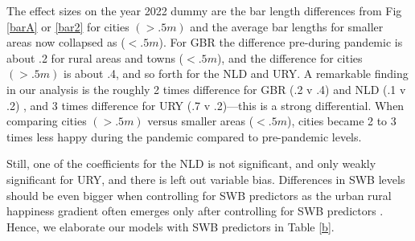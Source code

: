 \documentclass[10pt, letterpaper]{article}
\begin{document}
\begin{spacing}{1.4}
The effect sizes on the year 2022 dummy are the bar length differences from Fig
\ref{barA} or \ref{bar2} for cities $(>.5m)$ and the average bar lengths for smaller
areas now collapsed as ($<.5m$). For GBR the difference pre-during pandemic is about .2 for rural areas and towns ($<.5m$), and the difference for cities $(>.5m)$ is about .4, and so
forth for the NLD and URY.
 A remarkable finding in our analysis is the roughly 2 times difference for GBR (.2 v .4)
 and NLD (.1 v .2) , and 3 times difference for URY (.7 v .2)---this is a strong differential. When comparing cities $(>.5m)$ versus smaller areas ($<.5m$), cities became 2 to 3 times less happy during the pandemic compared to pre-pandemic levels.
 
Still, one of the coefficients for the NLD is not significant, and only weakly
significant for URY, and there is left out variable bias. {Differences in SWB levels should be even bigger when controlling for SWB predictors as the urban rural happiness gradient often emerges only after controlling for SWB predictors \citep{aok21}.} Hence, we elaborate our models with SWB predictors in Table \ref{b}.


\end{spacing}
\end{document}
